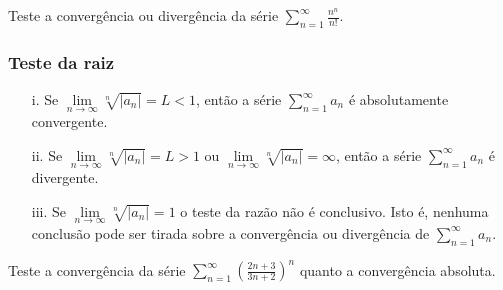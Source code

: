 \vspace*{5cm}
\begin{ex}
	Teste a convergência ou divergência da série $\sum_{n=1}^{\infty}\frac{n^{n}}{n!}$. 
\end{ex}
\vspace*{5cm}
\subsubsection{Teste da raiz} 
\begin{itemize}
	\item[i.]Se $\lim\limits_{n\rightarrow\infty} \sqrt[n]{\left|a_{n} \right| }=L<1$, então a série $\sum_{n=1}^{\infty}a_{n}$ é absolutamente convergente.
	\item[ii.]Se $\lim\limits_{n\rightarrow\infty} \sqrt[n]{\left|a_{n} \right| }=L>1$ ou $\lim\limits_{n\rightarrow\infty} \sqrt[n]{\left|a_{n} \right| }=\infty$, então a série $\sum_{n=1}^{\infty}a_{n}$ é divergente.
	\item[iii.]Se $\lim\limits_{n\rightarrow\infty} \sqrt[n]{\left|a_{n} \right| }=1$ o teste da razão não é conclusivo. Isto é, nenhuma conclusão pode ser tirada sobre a convergência ou divergência de $\sum_{n=1}^{\infty}a_{n}$. 
\end{itemize}
\begin{ex}
	Teste a convergência da série $\sum_{n=1}^{\infty}(\frac{2n+3}{3n+2})^{n}$ quanto a convergência absoluta. 
\end{ex}










